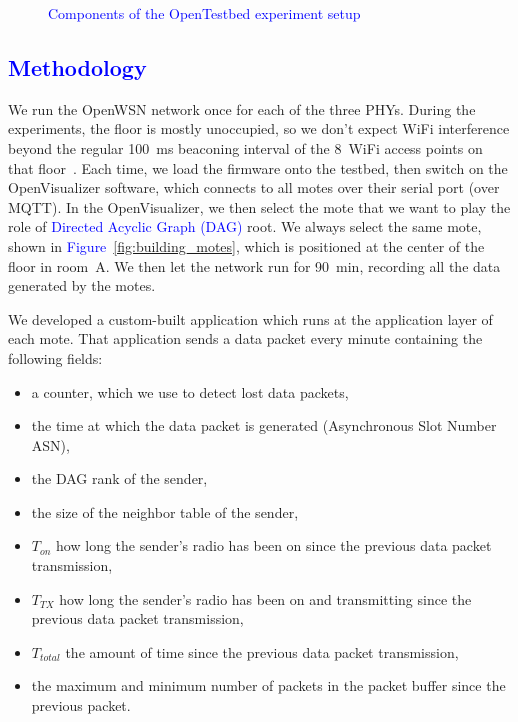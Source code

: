 \documentclass[sensors,article,submit,moreauthors,pdftex]{Definitions/mdpi}
\newcommand{\update}[1]     {\textcolor{blue}{#1}}
\begin{document}
\begin{figure}
\begin{subfigure}{0.24\columnwidth}
    	\subcaption{\update{the OpenTestbox, part of the OpenTestbed}}
        \label{fig:ot_box}
	\end{subfigure}
	
	\caption{
	    \update{Components of the OpenTestbed experiment setup}
	}
	\label{fig:mote_ot}
\end{figure}


\subsection{\update{Methodology}}
\label{sec:methodology}


We run the OpenWSN network once for each of the three PHYs.
During the experiments, the floor is mostly unoccupied, so we don't expect WiFi interference beyond the regular 100~ms beaconing interval of the 8~WiFi access points on that floor~\cite{munoz18overview}.
Each time, we load the firmware onto the testbed, then switch on the OpenVisualizer software, which connects to all motes over their serial port (over MQTT).
In the OpenVisualizer, we then select the mote that we want to play the role of \update{Directed Acyclic Graph (DAG)} root.
We always select the same mote, shown in \update{Figure}~\ref{fig:building_motes}, which is positioned at the center of the floor in room~A.
We then let the network run for 90~min, recording all the data generated by the motes.


We developed a custom-built application which runs at the application layer of each mote.
That application sends a data packet every minute containing the following fields:

\begin{itemize}
    \item a counter, which we use to detect lost data packets,
    \item the time at which the data packet is generated (Asynchronous Slot Number ASN),
    \item the DAG rank of the sender,
    \item the size of the neighbor table of the sender,
    \item $T_{on}$ how long the sender's radio has been on since the previous data packet transmission,
    \item $T_{TX}$ how long the sender's radio has been on and transmitting since the previous data packet transmission,
    \item $T_{total}$ the amount of time since the previous data packet transmission,
    \item the maximum and minimum number of packets in the packet buffer since the previous packet.
\end{itemize}
\end{document}
